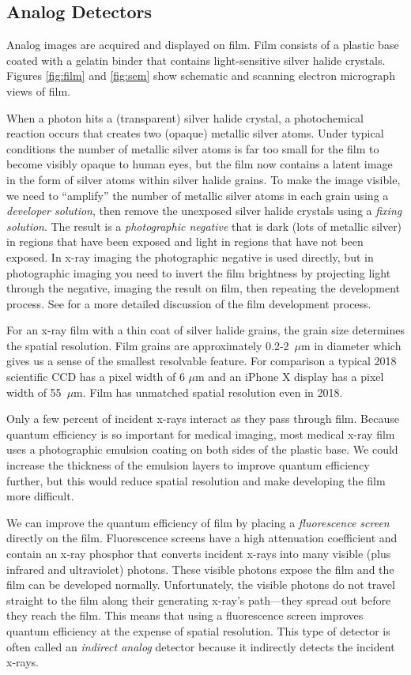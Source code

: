 \documentclass[mphy386-notes.tex]{subfiles}
\begin{document}
\subsection{Analog Detectors}
Analog images are acquired and displayed on film. Film consists of a plastic
base coated with a gelatin binder that contains light-sensitive silver halide
crystals. Figures \ref{fig:film} and \ref{fig:sem} show schematic and scanning
electron micrograph views of film.

When a photon hits a (transparent) silver halide crystal, a photochemical
reaction occurs that creates two (opaque) metallic silver atoms. Under typical
conditions the number of metallic silver atoms is far too small for the film to
become visibly opaque to human eyes, but the film now contains a latent image in
the form of silver atoms within silver halide grains. To make the image visible,
we need to ``amplify'' the number of metallic silver atoms in each grain using a
\textit{developer solution}, then remove the unexposed silver halide crystals
using a \textit{fixing solution}. The result is a \textit{photographic negative}
that is dark (lots of metallic silver) in regions that have been exposed and
light in regions that have not been exposed. In x-ray imaging the photographic
negative is used directly, but in photographic imaging you need to invert the
film brightness by projecting light through the negative, imaging the result on
film, then repeating the development process. See \cite{barrett, stack} for a more
detailed discussion of the film development process.

For an x-ray film with a thin coat of silver halide grains, the grain size
determines the spatial resolution. Film grains are approximately 0.2-2~$\mu$m in
diameter which gives us a sense of the smallest resolvable feature. For
comparison a typical 2018 scientific CCD has a pixel width of 6 $\mu$m and an
iPhone X display has a pixel width of 55~$\mu$m. Film has unmatched spatial
resolution even in 2018.

Only a few percent of incident x-rays interact as they pass through film.
Because quantum efficiency is so important for medical imaging, most medical
x-ray film uses a photographic emulsion coating on both sides of the plastic
base. We could increase the thickness of the emulsion layers to improve quantum
efficiency further, but this would reduce spatial resolution and make developing
the film more difficult.

We can improve the quantum efficiency of film by placing a \textit{fluorescence
  screen} directly on the film. Fluorescence screens have a high attenuation
coefficient and contain an x-ray phosphor that converts incident x-rays into
many visible (plus infrared and ultraviolet) photons. These visible photons
expose the film and the film can be developed normally. Unfortunately, the
visible photons do not travel straight to the film along their generating
x-ray's path---they spread out before they reach the film. This means that using
a fluorescence screen improves quantum efficiency at the expense of spatial
resolution. This type of detector is often called an \textit{indirect analog}
detector because it indirectly detects the incident x-rays.
\end{document}
